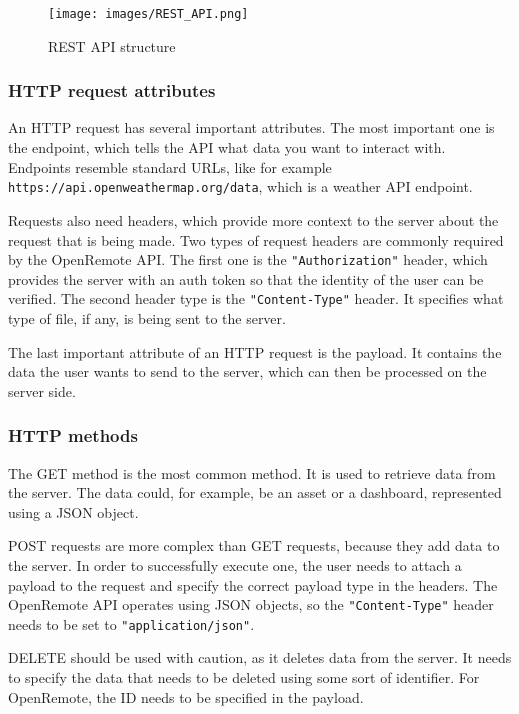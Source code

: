 \begin{figure} [ht]
    \centering
    \texttt{[image: images/REST\_API.png]}
    \caption{REST API structure}
    \label{fig:rest_api}
\end{figure}

\subsubsection{HTTP request attributes}\label{http_req_attrs}
An HTTP request has several important attributes. The most important one is the endpoint, which tells the API what data you want to interact with. Endpoints resemble standard URLs, like for example \lstinline|https://api.openweathermap.org/data|, which is a weather API endpoint. 

Requests also need headers, which provide more context to the server about the request that is being made. Two types of request headers are commonly required by the OpenRemote API. The first one is the \lstinline{"Authorization"} header, which provides the server with an auth token so that the identity of the user can be verified. The second header type is the \lstinline{"Content-Type"} header. It specifies what type of file, if any, is being sent to the server.

The last important attribute of an HTTP request is the payload. It contains the data the user wants to send to the server, which can then be processed on the server side.

\subsubsection{HTTP methods}
The GET method is the most common method. It is used to retrieve data from the server. The data could, for example, be an asset or a dashboard, represented using a JSON object.

POST requests are more complex than GET requests, because they add data to the server. In order to successfully execute one, the user needs to attach a payload to the request and specify the correct payload type in the headers. The OpenRemote API operates using JSON objects, so the \lstinline{"Content-Type"} header needs to be set to \lstinline{"application/json"}.

DELETE should be used with caution, as it deletes data from the server. It needs to specify the data that needs to be deleted using some sort of identifier. For OpenRemote, the ID needs to be specified in the payload. 

